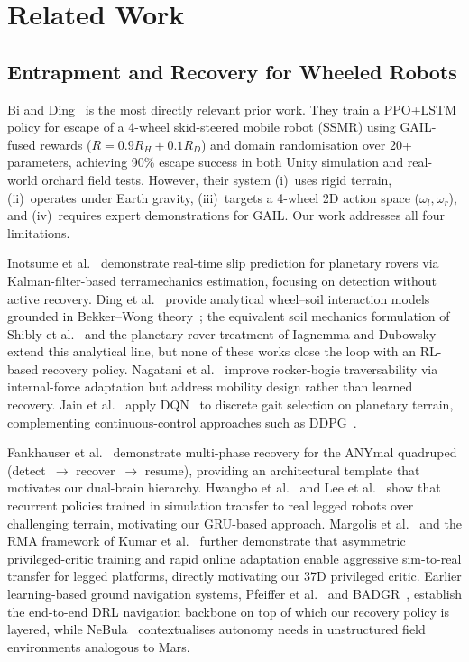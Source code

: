 \documentclass[conference]{IEEEtran}
\begin{document}
\enlargethispage{-2\baselineskip}

\section{Related Work}
\label{sec:related}

\subsection{Entrapment and Recovery for Wheeled Robots}

Bi and Ding~\cite{bi2026escape} is the most directly relevant prior work.
They train a PPO+LSTM policy for escape of a 4-wheel skid-steered mobile robot
(SSMR) using GAIL-fused rewards ($R = 0.9R_H + 0.1R_D$) and domain
randomisation over 20+ parameters, achieving 90\% escape success in both Unity
simulation and real-world orchard field tests. However, their system
(i)~uses rigid terrain, (ii)~operates under Earth gravity,
(iii)~targets a 4-wheel 2D action space ($\omega_l, \omega_r$), and
(iv)~requires expert demonstrations for GAIL.
Our work addresses all four limitations.

Inotsume et al.~\cite{inotsume2020} demonstrate real-time slip prediction for
planetary rovers via Kalman-filter-based terramechanics estimation, focusing on
detection without active recovery. Ding et al.~\cite{ding2011} provide analytical
wheel--soil interaction models grounded in Bekker--Wong theory~\cite{bekker1960};
the equivalent soil mechanics formulation of Shibly et
al.~\cite{shibly2005} and the planetary-rover treatment of Iagnemma and
Dubowsky~\cite{iagnemma2004} extend this analytical line, but none of these
works close the loop with an RL-based recovery policy. Nagatani et
al.~\cite{nagatani2011} improve rocker-bogie traversability via internal-force
adaptation but address mobility design rather than learned recovery.
Jain et al.~\cite{jain2019} apply DQN~\cite{mnih2015dqn} to discrete gait
selection on planetary terrain, complementing continuous-control approaches
such as DDPG~\cite{lillicrap2016ddpg}.

Fankhauser et al.~\cite{fankhauser2018} demonstrate multi-phase recovery for
the ANYmal quadruped (detect~$\to$ recover~$\to$ resume), providing an
architectural template that motivates our dual-brain hierarchy. Hwangbo et
al.~\cite{hwangbo2019anymal} and Lee et al.~\cite{lee2020quadruped} show that
recurrent policies trained in simulation transfer to real legged robots over
challenging terrain, motivating our GRU-based approach. Margolis et
al.~\cite{margolis2022rapid} and the RMA framework of Kumar et
al.~\cite{kumar2021rma} further demonstrate that asymmetric privileged-critic
training and rapid online adaptation enable aggressive sim-to-real transfer
for legged platforms, directly motivating our 37D privileged critic.
Earlier learning-based ground navigation systems, Pfeiffer et
al.~\cite{pfeiffer2017drl} and BADGR~\cite{kahn2021badgr}, establish the
end-to-end DRL navigation backbone on top of which our recovery policy is
layered, while NeBula~\cite{aghamohammadi2021nebula} contextualises autonomy
needs in unstructured field environments analogous to Mars.
\end{document}
